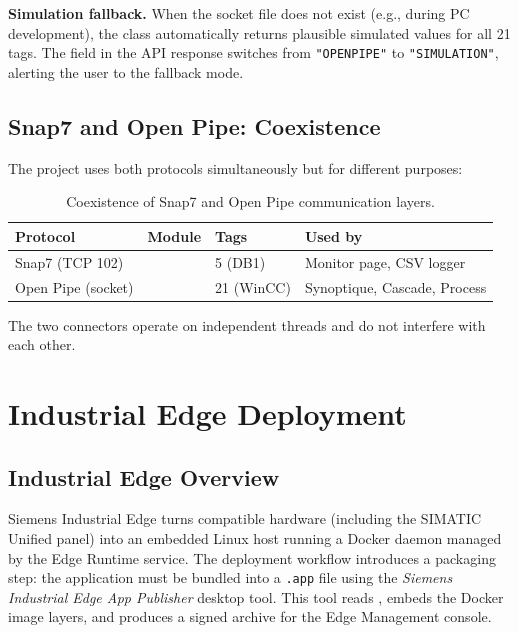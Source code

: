 \textbf{Simulation fallback.}
When the socket file does not exist (e.g., during PC development), the
 class automatically returns plausible simulated values for all
21 tags. The  field in the API response switches from \texttt{"OPENPIPE"} to
\texttt{"SIMULATION"}, alerting the user to the fallback mode.

\subsection{Snap7 and Open Pipe: Coexistence}

The project uses both protocols simultaneously but for different purposes:

\begin{table}[H]
  \centering
  \caption{Coexistence of Snap7 and Open Pipe communication layers.}
  \label{tab:protocols}
  \begin{tabular}{@{}L{2.5cm}L{3.5cm}C{1.8cm}L{4cm}@{}}
    \toprule
    \textbf{Protocol} & \textbf{Module} & \textbf{Tags} & \textbf{Used by} \\
    \midrule
    Snap7 (TCP 102)   &      & 5 (DB1)  & Monitor page, CSV logger \\
    Open Pipe (socket)& & 21 (WinCC)& Synoptique, Cascade, Process \\
    \bottomrule
  \end{tabular}
\end{table}

The two connectors operate on independent threads and do not interfere with each other.

\section{Industrial Edge Deployment}

\subsection{Industrial Edge Overview}

Siemens Industrial Edge turns compatible hardware (including the SIMATIC Unified panel)
into an embedded Linux host running a Docker daemon managed by the Edge Runtime service.
The deployment workflow introduces a packaging step: the application must be bundled into
a \texttt{.app} file using the \textit{Siemens Industrial Edge App Publisher} desktop tool.
This tool reads , embeds the Docker image layers, and
produces a signed archive for the Edge Management console.

